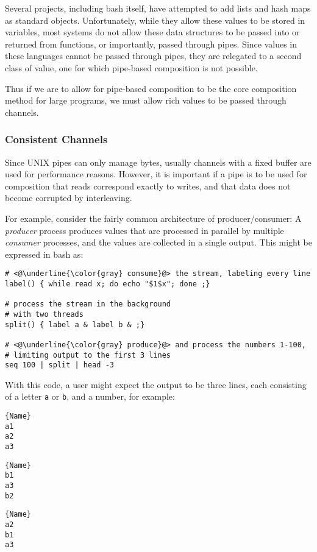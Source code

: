 \documentclass[english,PRO]{ipsj}
\begin{document}
Several projects\cite{haahr,duff}, including bash itself, have attempted to add lists and hash maps as standard objects. Unfortunately, while they allow these values to be stored in variables, most systems do not allow these data structures to be passed into or returned from functions, or importantly, passed through pipes.
Since values in these languages cannot be passed through pipes, they are relegated to a second class of value, one for which pipe-based composition is not possible.

Thus if we are to allow for pipe-based composition to be the core composition method for large programs, we must allow rich values to be passed through channels.

\subsubsection{Consistent Channels}\noindent
Since UNIX pipes can only manage bytes, usually channels with a fixed buffer are used for performance reasons. However, it is important if a pipe is to be used for composition that reads correspond exactly to writes, and that data does not become corrupted by interleaving.

For example, consider the fairly common architecture of producer/consumer: A \emph{producer} process produces values that are processed in parallel by multiple \emph{consumer} processes, and the values are collected in a single output. This might be expressed in bash as:
\noindent\begin{lstlisting}[morekeywords={do,done}]
# <@\underline{\color{gray} consume}@> the stream, labeling every line
label() { while read x; do echo "$1$x"; done ;}

# process the stream in the background
# with two threads
split() { label a & label b & ;}

# <@\underline{\color{gray} produce}@> and process the numbers 1-100,
# limiting output to the first 3 lines
seq 100 | split | head -3
\end{lstlisting}

\noindent
With this code, a user might expect the output to be three lines, each consisting of a letter \verb/a/ or \verb/b/, and a number, for example:

\noindent\begin{minipage}{.14\textwidth}
\begin{lstlisting}{Name}
a1
a2
a3
\end{lstlisting}
\end{minipage}\hfill
\begin{minipage}{.14\textwidth}
\begin{lstlisting}{Name}
b1
a3
b2
\end{lstlisting}
\end{minipage}\hfill
\begin{minipage}{.14\textwidth}
\begin{lstlisting}{Name}
a2
b1
a3
\end{lstlisting}
\end{minipage}
\end{document}
